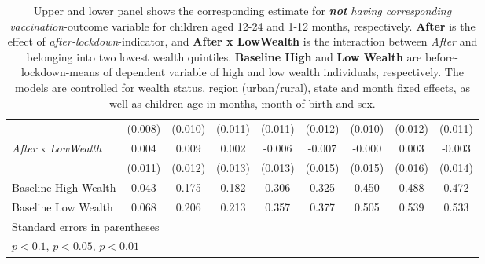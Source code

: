 \begin{table}[htbp]
\begin{tabular}{l*{8}{c}}
                    &     (0.008)         &     (0.010)         &     (0.011)         &     (0.011)         &     (0.012)         &     (0.010)         &     (0.012)         &     (0.011)         \\
[1em]
\textit{After} x \textit{LowWealth}&       0.004         &       0.009         &       0.002         &      -0.006         &      -0.007         &      -0.000         &       0.003         &      -0.003         \\
                    &     (0.011)         &     (0.012)         &     (0.013)         &     (0.013)         &     (0.015)         &     (0.015)         &     (0.016)         &     (0.014)         \\
\hline
Baseline High Wealth&       0.043         &       0.175         &       0.182         &       0.306         &       0.325         &       0.450         &       0.488         &       0.472         \\
Baseline Low Wealth &       0.068         &       0.206         &       0.213         &       0.357         &       0.377         &       0.505         &       0.539         &       0.533         \\
\hline\hline \multicolumn{9}{l}{\footnotesize Standard errors in parentheses}\\ \multicolumn{9}{l}{\footnotesize \sym{*} \(p<0.1\), \sym{**} \(p<0.05\), \sym{***} \(p<0.01\)}\\ \end{tabular} \\ \caption*{\footnotesize Upper and lower panel shows the corresponding estimate for \textit{\textbf{not} having corresponding vaccination}-outcome variable for children aged 12-24 and 1-12 months, respectively. \textbf{After} is the effect of \textit{after-lockdown}-indicator, and \textbf{After x LowWealth} is the interaction between \textit{After} and belonging into two lowest wealth quintiles. \textbf{Baseline High} and \textbf{Low Wealth} are before-lockdown-means of dependent variable of high and low wealth individuals, respectively. The models are controlled for wealth status, region (urban/rural), state and month fixed effects, as well as children age in months, month of birth and sex.} \end{table}
